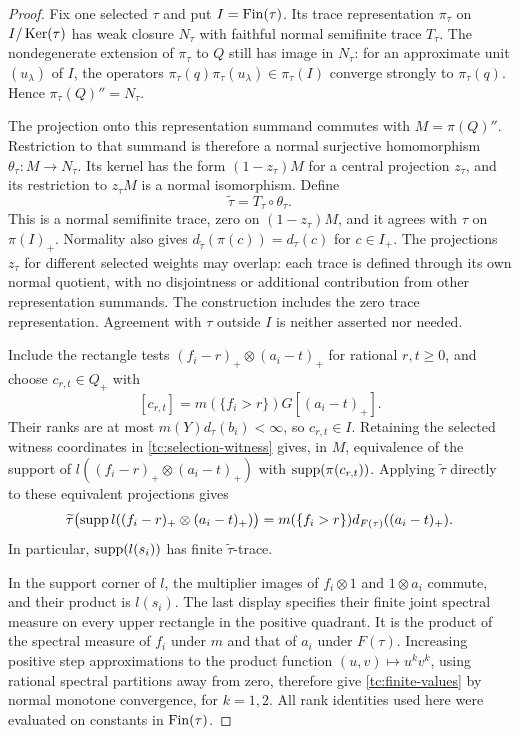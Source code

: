 \begin{proof}
Fix one selected $\tau$ and put $I=\operatorname{Fin}(\tau)$.  Its trace representation
$\pi_\tau$ on $I/\operatorname{Ker}(\tau)$ has weak closure $N_\tau$ with faithful
normal semifinite trace $T_\tau$.  The nondegenerate extension of
$\pi_\tau$ to $Q$ still has image in $N_\tau$: for an approximate unit
$(u_\lambda)$ of $I$, the operators
$\pi_\tau(q)\pi_\tau(u_\lambda)\in\pi_\tau(I)$ converge strongly to
$\pi_\tau(q)$.  Hence $\pi_\tau(Q)''=N_\tau$.

The projection onto this representation summand commutes with
$M=\pi(Q)''$.  Restriction to that summand is therefore a normal
surjective homomorphism $\theta_\tau:M\to N_\tau$.  Its kernel has
the form $(1-z_\tau)M$ for a central projection $z_\tau$, and its
restriction to $z_\tau M$ is a normal isomorphism.  Define
\[
 \widetilde\tau=T_\tau\circ\theta_\tau.
\]
This is a normal semifinite trace, zero on $(1-z_\tau)M$, and it agrees
with $\tau$ on $\pi(I)_+$.  Normality also gives
$d_{\widetilde\tau}(\pi(c))=d_\tau(c)$ for $c\in I_+$.
The projections $z_\tau$ for different selected weights may overlap:
each trace is defined through its own normal quotient, with no
disjointness or additional contribution from other representation
summands.  The construction includes the zero trace representation.
Agreement with $\tau$ outside $I$ is neither asserted nor needed.

Include the rectangle tests
$(f_i-r)_+\otimes(a_i-t)_+$ for rational $r,t\geq0$, and choose
$c_{r,t}\in Q_+$ with
\[
 [c_{r,t}]=m(\{f_i>r\})G[(a_i-t)_+].
\]
Their ranks are at most $m(Y)d_\tau(b_i)<\infty$, so $c_{r,t}\in I$.
Retaining the selected witness coordinates in
\eqref{tc:selection-witness} gives, in $M$, equivalence of the support
of $l((f_i-r)_+\otimes(a_i-t)_+)$ with $\operatorname{supp}(\pi(c_{r,t}))$.
Applying $\widetilde\tau$ directly to these equivalent projections gives
\[
 \widetilde\tau\bigl(\operatorname{supp} l((f_i-r)_+\otimes(a_i-t)_+)\bigr)
    =m(\{f_i>r\})d_{F(\tau)}((a_i-t)_+).
\]
In particular, $\operatorname{supp}(l(s_i))$ has finite $\widetilde\tau$-trace.

In the support corner of $l$, the multiplier images of $f_i\otimes1$
and $1\otimes a_i$ commute, and their product is $l(s_i)$.  The last
display specifies their finite joint spectral measure on every upper
rectangle in the positive quadrant.  It is the product of the
spectral measure of $f_i$ under $m$ and that of $a_i$ under $F(\tau)$.
Increasing positive step approximations to the product function
$(u,v)\mapsto u^kv^k$, using rational spectral partitions away from
zero, therefore give \eqref{tc:finite-values} by normal monotone
convergence, for $k=1,2$.  All rank identities used here were evaluated
on constants in $\operatorname{Fin}(\tau)$.
\end{proof}


